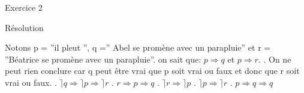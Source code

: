 \hypertarget{Exercice_2}{
\Huge{\begin{center}Exercice 2\end{center} \leavevmode\newline }}


\hypertarget{resolution}{%
\LARGE{Résolution}\label{resolution}}
\newline
\newline
Notons p = ”il pleut ”, q =” Abel se promène avec un parapluie” et r = ”Béatrice se promène avec un parapluie”.
\newline
on sait que: $p\Rightarrow q$ et $p \Rightarrow r$.
\newline
{}. On ne peut rien conclure car q peut être vrai que p soit vrai ou faux et donc que r soit vrai ou faux.
\newline
{}. $\rceil q \Rightarrow \rceil p \Rightarrow \rceil r$
\newline
{}. $r \Rightarrow p \Rightarrow q$
\newline
{}. $\rceil r \Rightarrow \rceil p$
\newline
{}. $\rceil p \Rightarrow \rceil r$
\newline
{}. $p \Rightarrow q \Rightarrow q$

